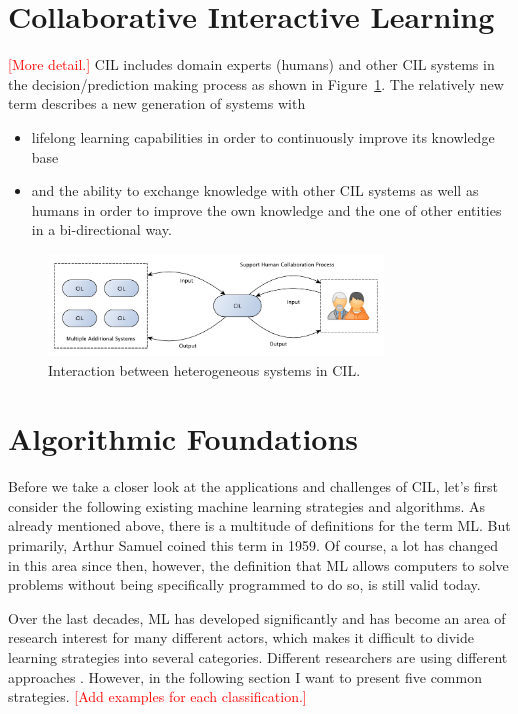 \documentclass[conference]{IEEEtran}
\newcommand\notes[1]{\textcolor{red}{#1}}
\begin{document}
\section{Collaborative Interactive Learning}\label{sec:cil}
\notes{[More detail.]}
CIL includes domain experts (humans) 
and other CIL systems in the decision/prediction making process as shown in 
Figure~\ref{fig:CIL}. The relatively new term describes a new 
generation of systems with
\begin{itemize}
    \item lifelong learning capabilities in order to continuously improve its 
        knowledge base
    \item and the ability to exchange knowledge with other CIL systems as well as humans 
        in order to improve the own knowledge and the one of other entities in a 
        bi-directional way\cite{CIL:sick}.
\end{itemize}
\begin{figure}[!h]
\centering
\includegraphics[width=3.5in]{images/CIL}
\caption{Interaction between heterogeneous systems in CIL.}
\label{fig:CIL}
\end{figure}


\section{Algorithmic Foundations}
\label{sec:algos}
Before we take a closer look at the applications and challenges of CIL, let's first consider the 
following existing machine learning strategies and algorithms. As already mentioned above, 
there is a multitude of definitions for the term ML\@. But primarily, Arthur Samuel 
coined this term in 1959. Of course, a lot has changed in this area since then, 
however, the definition that ML allows computers to solve problems without being 
specifically programmed to do so, is still valid today\cite{MLStudiesUsingCheckers:samuel}.

Over the last decades, ML has developed significantly and has become an area of
research interest for many different actors, which makes it difficult to divide learning 
strategies into several categories. Different researchers are using different approaches 
\cite{FoundationsOfML:mohri}\cite{Structure:corne}. 
However, in the following section I want to present five common strategies\cite{FoundationsOfML:mohri}.
\notes{[Add examples for each classification.]}
\end{document}
